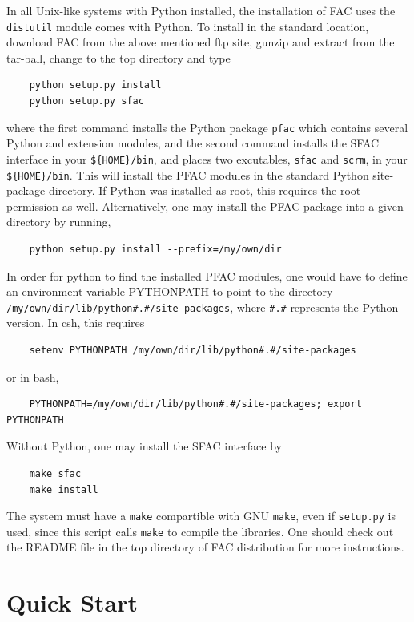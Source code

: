 \documentclass[twoside,letterpaper]{refrep}
\begin{document}
In all Unix-like systems with Python installed, the installation of FAC 
uses the \verb|distutil| module comes with Python. To install in the standard 
location, download FAC from the above mentioned ftp site, gunzip and extract 
from the tar-ball, change to the top directory and type 
\begin{verbatim}
    python setup.py install
    python setup.py sfac
\end{verbatim}
where the first command installs the Python package \verb|pfac| which 
contains several Python and extension modules, and the second command
installs the SFAC interface in your \verb|${HOME}/bin|, and places two
excutables, \verb|sfac| and \verb|scrm|, in your \verb|${HOME}/bin|. 
This will install the PFAC modules in the standard Python site-package
directory. If Python was installed as root, this requires the root permission
as well. Alternatively, one may install the PFAC package into a given
directory by running, 
\begin{verbatim}
    python setup.py install --prefix=/my/own/dir
\end{verbatim} 
In order for python to find the installed PFAC modules, one would have to 
define an environment variable PYTHONPATH to point to the directory
\verb|/my/own/dir/lib/python#.#/site-packages|, where \verb|#.#| represents
the Python version. In csh, this requires
\begin{verbatim}
    setenv PYTHONPATH /my/own/dir/lib/python#.#/site-packages
\end{verbatim}
or in bash,
\begin{verbatim}
    PYTHONPATH=/my/own/dir/lib/python#.#/site-packages; export PYTHONPATH
\end{verbatim}

Without Python, one may install the SFAC interface by
\begin{verbatim}
    make sfac
    make install
\end{verbatim}

The system must have a \verb|make| compartible with GNU \verb|make|, even if
\verb|setup.py| is used, since this script calls \verb|make| to compile the
libraries. One should check out the README file in the top directory of FAC 
distribution for more instructions.

\section{Quick Start}
\label{sec:start}
\end{document}
